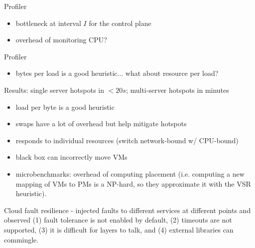 \documentclass{article}
\newcommand{\xmark}{\ding{55}}%
\begin{document}
Profiler
\begin{itemize}
	\item[\xmark] bottleneck at interval \(I\) for the control plane
	\item[\xmark] overhead of monitoring CPU?
\end{itemize}
Profiler
\begin{itemize}
	\item[\xmark] bytes per load is a good heuristic... what about resource per load?
\end{itemize}
Results: single server hotspots in \(< 20 s\); multi-server hotspots in minutes
\begin{itemize}
	\item load per byte is a good heuristic
	\item swaps have a lot of overhead but help mitigate hotspots
	\item responds to individual resources (switch network-bound w/ CPU-bound)
	\item black box can incorrectly move VMs
	\item microbenchmarks: overhead of computing placement (i.e. computing a new mapping of VMs to PMs is a NP-hard, so they approximate it with the VSR heuristic). 
\end{itemize}

\noindent\cite{} Cloud fault resilience - injected faults to different services at different points and observed (1) fault tolerance is not enabled by default, (2) timeouts are not supported, (3) it is difficult for layers to talk, and (4) external libraries can commingle.\\

\end{document}
